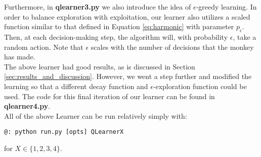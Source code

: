 \documentclass[letterpaper]{article}
\begin{document}
Furthermore, in \textbf{qlearner3.py} we also introduce the idea of $\epsilon$-greedy learning. In order to balance exploration with exploitation, our learner also utilizes a scaled function similar to that defined in Equation \ref{eq:harmonic} with parameter $p_{\epsilon}$. Then, at each decision-making step, the algorithm will, with probability $\epsilon$, take a random action. Note that $\epsilon$ scales with the number of decisions that the monkey has made. \\

The above learner had good results, as is discussed in Section \ref{sec:results_and_discussion}. However, we went a step further and modified the learning so that a different decay function and $\epsilon$-exploration function could be used. The code for this final iteration of our learner can be found in \textbf{qlearner4.py}.\\

All of the above Learner can be run relatively simply with:
\begin{verbatim}
@: python run.py [opts] QLearnerX
\end{verbatim}
for $X \in \{1,2,3,4\}$. 
\end{document}
